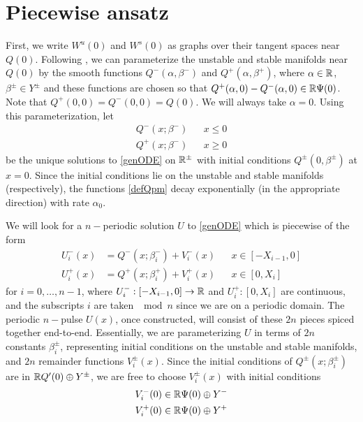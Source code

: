 \documentclass[thesis.tex]{subfiles}
\begin{document}
\section{Piecewise ansatz}

First, we write $W^u(0)$ and $W^s(0)$ as graphs over their tangent spaces near $Q(0)$. Following \cite{Sandstede1997}, we can parameterize the unstable and stable manifolds near $Q(0)$ by the smooth functions $Q^-(\alpha, \beta^-)$ and $Q^+(\alpha, \beta^+)$, where $\alpha \in \mathbb{R}$, $\beta^\pm \in Y^\pm$ and these functions are chosen so that $Q^+(\alpha, 0) - Q^-(\alpha, 0) \in \mathbb{R} \Psi(0)$. Note that $Q^+(0, 0) = Q^-(0, 0) = Q(0)$. We will always take $\alpha = 0$. Using this parameterization, let
\begin{equation}\label{defQpmx}
\begin{aligned}
Q^-(x; \beta^-) && x \leq 0 \\
Q^+(x; \beta^-) && x \geq 0
\end{aligned}
\end{equation}
be the unique solutions to \eqref{genODE} on $\mathbb{R}^\pm$ with initial conditions $Q^\pm(0, \beta^\pm)$ at $x = 0$. Since the initial conditions lie on the unstable and stable manifolds (respectively), the functions \cref{defQpm} decay exponentially (in the appropriate direction) with rate $\alpha_0$.

We will look for a $n-$periodic solution $U$ to \eqref{genODE} which is piecewise of the form
\begin{equation}\label{Upiecewise}
\begin{aligned}
U_i^-(x) &= Q^-(x; \beta_i^-) + V_i^-(x) && x \in [-X_{i-1}, 0] \\
U_i^+(x) &= Q^+(x; \beta_i^+) + V_i^+(x) && x \in [0, X_i]
\end{aligned}
\end{equation}
for $i = 0, \dots, n-1$, where $U_i^-: [-X_{i-1}, 0] \rightarrow \mathbb{R}$ and $U_i^+: [0, X_i]$ are continuous, and the subscripts $i$ are taken $\mod n$ since we are on a periodic domain. The periodic $n-$pulse $U(x)$, once constructed, will consist of these $2n$ pieces spiced together end-to-end. Essentially, we are parameterizing $U$ in terms of $2n$ constants $\beta_i^\pm$, representing initial conditions on the unstable and stable manifolds, and $2n$ remainder functions $V_i^\pm(x)$. Since the initial conditions of $Q^\pm(x; \beta_i^\pm)$ are in $\mathbb{R} Q'(0) \oplus Y^\pm$, we are free to choose $V_i^\pm(x)$ with initial conditions
\begin{align*}
V_i^-(0) &\in \mathbb{R} \Psi(0) \oplus Y^- \\
V_i^+(0) &\in \mathbb{R} \Psi(0) \oplus Y^+
\end{align*}
\end{document}

